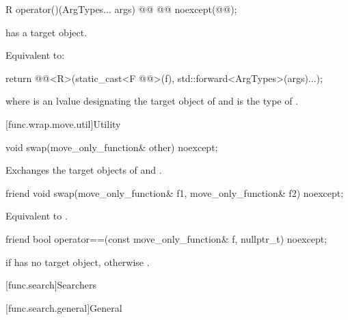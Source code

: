 %
\begin{itemdecl}
R operator()(ArgTypes... args) @\cv{}@ @@ noexcept(@@);
\end{itemdecl}

\begin{itemdescr}
\pnum
\expects
{} has a target object.

\pnum
\effects
Equivalent to:
\begin{codeblock}
return @@<R>(static_cast<F @@>(f), std::forward<ArgTypes>(args)...);
\end{codeblock}
where  is an lvalue designating the target object of  and
 is the type of .
\end{itemdescr}

[func.wrap.move.util]{Utility}

%
\begin{itemdecl}
void swap(move_only_function& other) noexcept;
\end{itemdecl}

\begin{itemdescr}
\pnum
\effects
Exchanges the target objects of  and .
\end{itemdescr}

%
\begin{itemdecl}
friend void swap(move_only_function& f1, move_only_function& f2) noexcept;
\end{itemdecl}

\begin{itemdescr}
\pnum
\effects
Equivalent to .
\end{itemdescr}

%
\begin{itemdecl}
friend bool operator==(const move_only_function& f, nullptr_t) noexcept;
\end{itemdecl}

\begin{itemdescr}
\pnum
\returns
{} if  has no target object, otherwise .
\end{itemdescr}

[func.search]{Searchers}

[func.search.general]{General}

